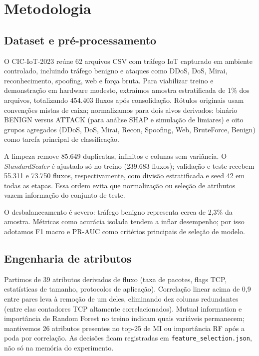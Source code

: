 \documentclass[12pt]{article}
\begin{document}
\section{Metodologia}

\subsection{Dataset e pré-processamento}

O CIC-IoT-2023 reúne 62 arquivos CSV com tráfego IoT capturado em ambiente controlado, incluindo tráfego benigno e ataques como DDoS, DoS, Mirai, reconhecimento, spoofing, web e força bruta.
Para viabilizar treino e demonstração em hardware modesto, extraímos amostra estratificada de 1\% dos arquivos, totalizando 454.403 fluxos após consolidação.
Rótulos originais usam convenções mistas de caixa; normalizamos para dois alvos derivados: binário BENIGN versus ATTACK (para análise SHAP e simulação de limiares) e oito grupos agregados (DDoS, DoS, Mirai, Recon, Spoofing, Web, BruteForce, Benign) como tarefa principal de classificação.

A limpeza remove 85.649 duplicatas, infinitos e colunas sem variância.
O \textit{StandardScaler} é ajustado só no treino (239.683 fluxos); validação e teste recebem 55.311 e 73.750 fluxos, respectivamente, com divisão estratificada e seed 42 em todas as etapas.
Essa ordem evita que normalização ou seleção de atributos vazem informação do conjunto de teste.

O desbalanceamento é severo: tráfego benigno representa cerca de 2,3\% da amostra.
Métricas como acurácia isolada tendem a inflar desempenho; por isso adotamos F1 macro e PR-AUC como critérios principais de seleção de modelo.

\subsection{Engenharia de atributos}

Partimos de 39 atributos derivados de fluxo (taxa de pacotes, flags TCP, estatísticas de tamanho, protocolos de aplicação).
Correlação linear acima de 0,9 entre pares leva à remoção de um deles, eliminando dez colunas redundantes (entre elas contadores TCP altamente correlacionados).
Mutual information e importância de Random Forest no treino indicam quais variáveis permanecem; mantivemos 26 atributos presentes no top-25 de MI ou importância RF após a poda por correlação.
As decisões ficam registradas em \texttt{feature\_selection.json}, não só na memória do experimento.
\end{document}
